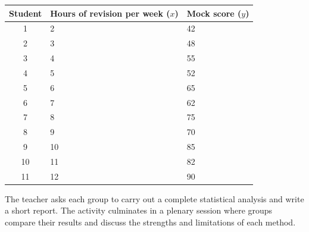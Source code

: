 \documentclass[11pt]{article}
\begin{document}
\begin{center}
\begin{tabularx}{\linewidth}{|c|X|X|}\hline
\rowcolor{popblueL} \textbf{Student} & \textbf{Hours of revision per week ($x$)} & \textbf{Mock score ($y$)} \\ \hline
1 & 2 & 42 \\ \hline
2 & 3 & 48 \\ \hline
3 & 4 & 55 \\ \hline
4 & 5 & 52 \\ \hline
5 & 6 & 65 \\ \hline
6 & 7 & 62 \\ \hline
7 & 8 & 75 \\ \hline
8 & 9 & 70 \\ \hline
9 & 10 & 85 \\ \hline
10 & 11 & 82 \\ \hline
11 & 12 & 90 \\ \hline
\end{tabularx}
\end{center}

The teacher asks each group to carry out a complete statistical analysis and write a short report. The activity culminates in a plenary session where groups compare their results and discuss the strengths and limitations of each method.
\end{document}
